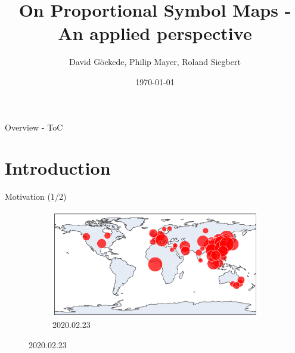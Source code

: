 \documentclass{beamer}
\title{On Proportional Symbol Maps - An applied perspective}
\date{\today}
\author{David Göckede, Philip Mayer, Roland Siegbert}
\institute{Geometry Lab SS 2020}
\begin{document}
\maketitle

\begin{frame}{Overview - ToC}
  \tableofcontents
\end{frame}

\section{Introduction}

\begin{frame}{Motivation (1/2)}

  \begin{figure}[!b]
    \centering
    \begin{subfigure}[b]{\linewidth}
      \centering
      \includegraphics[width=0.9\linewidth]{../covid_spread_20200223.png}
      \caption{2020.02.23}
    \end{subfigure}
  \end{figure}

\end{frame}
\end{document}
